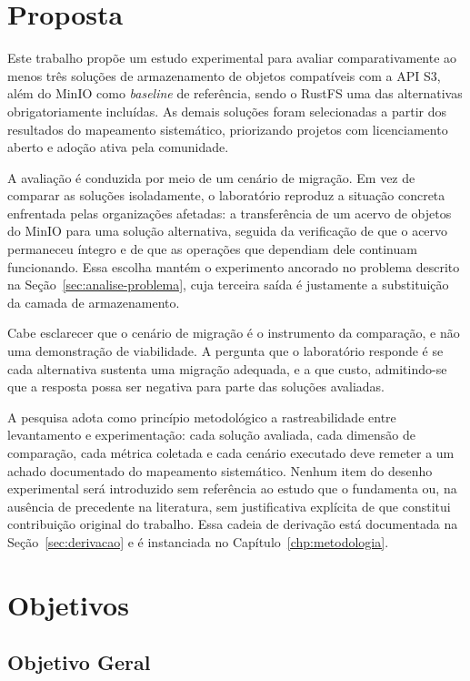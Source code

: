 \section{Proposta}

Este trabalho propõe um estudo experimental para avaliar comparativamente ao menos
três soluções de armazenamento de objetos compatíveis com a API S3, além do MinIO
como \textit{baseline} de referência, sendo o RustFS uma das alternativas
obrigatoriamente incluídas. As demais soluções foram selecionadas a partir dos
resultados do mapeamento sistemático, priorizando projetos com licenciamento aberto
e adoção ativa pela comunidade.

A avaliação é conduzida por meio de um cenário de migração. Em vez de comparar as
soluções isoladamente, o laboratório reproduz a situação concreta enfrentada pelas
organizações afetadas: a transferência de um acervo de objetos do MinIO para uma
solução alternativa, seguida da verificação de que o acervo permaneceu íntegro e de
que as operações que dependiam dele continuam funcionando. Essa escolha mantém o
experimento ancorado no problema descrito na Seção~\ref{sec:analise-problema}, cuja
terceira saída é justamente a substituição da camada de armazenamento.

Cabe esclarecer que o cenário de migração é o instrumento da comparação, e não uma
demonstração de viabilidade. A pergunta que o laboratório responde é se cada
alternativa sustenta uma migração adequada, e a que custo, admitindo-se que a
resposta possa ser negativa para parte das soluções avaliadas.

\noindent
A pesquisa adota como princípio metodológico a rastreabilidade entre levantamento
e experimentação: cada solução avaliada, cada dimensão de comparação, cada métrica
coletada e cada cenário executado deve remeter a um achado documentado do
mapeamento sistemático. Nenhum item do desenho experimental será introduzido sem
referência ao estudo que o fundamenta ou, na ausência de precedente na literatura,
sem justificativa explícita de que constitui contribuição original do trabalho.
Essa cadeia de derivação está documentada na Seção~\ref{sec:derivacao} e é
instanciada no Capítulo~\ref{chp:metodologia}.

\section{Objetivos}

\subsection{Objetivo Geral}
\label{sec:objetivo-geral}

